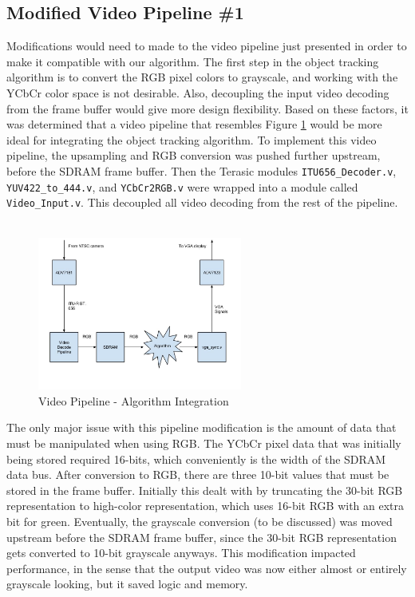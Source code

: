 \documentclass[11pt]{article} %
\begin{document}
\subsection{Modified Video Pipeline \#1}
\label{sec:modPipe}
Modifications would need to made to the video pipeline just presented in order to make it compatible with our algorithm. The first step in the object tracking algorithm is to convert the RGB pixel colors to grayscale, and working with the YCbCr color space is not desirable. Also, decoupling the input video decoding from the frame buffer would give more design flexibility. Based on these factors, it was determined that a video pipeline that resembles Figure \ref{fig:algoPipe} would be more ideal for integrating the object tracking algorithm. To implement this video pipeline, the upsampling and RGB conversion was pushed further upstream, before the SDRAM frame buffer. Then the Terasic modules \texttt{ITU656\_Decoder.v}, \texttt{YUV422\_to\_444.v}, and \texttt{YCbCr2RGB.v} were wrapped into a module called \texttt{Video\_Input.v}. This decoupled all video decoding from the rest of the pipeline. \\\\
\FloatBarrier
\begin{figure}[h]
\centering
\includegraphics[width=0.6\textwidth]{./images/desired_pipeline.jpg}
\caption{Video Pipeline - Algorithm Integration}
\label{fig:algoPipe}
\end{figure}
The only major issue with this pipeline modification is the amount of data that must be manipulated when using RGB. The YCbCr pixel data that was initially being stored required 16-bits, which conveniently is the width of the SDRAM data bus. After conversion to RGB, there are three 10-bit values that must be stored in the frame buffer. Initially this dealt with by truncating the 30-bit RGB representation to high-color representation, which uses 16-bit RGB with an extra bit for green. Eventually, the grayscale conversion (to be discussed) was moved upstream before the SDRAM frame buffer, since the 30-bit RGB representation gets converted to 10-bit grayscale anyways. This modification impacted performance, in the sense that the output video was now either almost or entirely grayscale looking, but it saved logic and memory.
\end{document}
